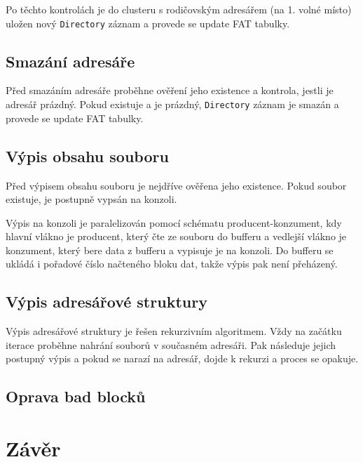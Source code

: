 \documentclass[11pt,a4paper]{scrartcl}
\begin{document}
	Po těchto kontrolách je do clusteru s rodičovským adresářem (na 1. volné místo) uložen nový \verb|Directory| záznam a provede se update FAT tabulky.
	
	\subsection{Smazání adresáře}
	Před smazáním adresáře proběhne ověření jeho existence a kontrola, jestli je adresář prázdný. Pokud existuje a je prázdný, \verb|Directory| záznam je smazán a provede se update FAT tabulky.
	
	\subsection{Výpis obsahu souboru}
	Před výpisem obsahu souboru je nejdříve ověřena jeho existence. Pokud soubor existuje, je postupně vypsán na konzoli.
	
	Výpis na konzoli je paralelizován pomocí schématu producent-konzument, kdy hlavní vlákno je producent, který čte ze souboru do bufferu a vedlejší vlákno je konzument, který bere data z bufferu a vypisuje je na konzoli. Do bufferu se ukládá i pořadové číslo načteného bloku dat, takže výpis pak není přeházený.
	
	\subsection{Výpis adresářové struktury}
	Výpis adresářové struktury je řešen rekurzivním algoritmem. Vždy na začátku iterace proběhne nahrání souborů v současném adresáři. Pak následuje jejich postupný výpis a pokud se narazí na adresář, dojde k rekurzi a proces se opakuje.
	
	\subsection{Oprava bad blocků}
	
	\section{Závěr}
	
\end{document}
